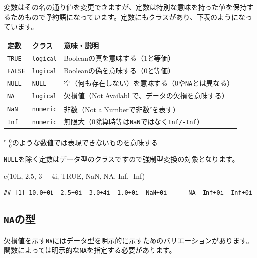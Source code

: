 \documentclass[
  12pt,
]{book}
\newenvironment{Shaded}{\begin{snugshade}}{\end{snugshade}}
\newcommand{\ConstantTok}[1]{\textcolor[rgb]{0.00,0.00,0.00}{#1}}
\newcommand{\DecValTok}[1]{\textcolor[rgb]{0.00,0.00,0.81}{#1}}
\newcommand{\FloatTok}[1]{\textcolor[rgb]{0.00,0.00,0.81}{#1}}
\newcommand{\FunctionTok}[1]{\textcolor[rgb]{0.00,0.00,0.00}{#1}}
\newcommand{\NormalTok}[1]{#1}
\newcommand{\SpecialCharTok}[1]{\textcolor[rgb]{0.00,0.00,0.00}{#1}}
\begin{document}
変数はその名の通り値を変更できますが、定数は特別な意味を持った値を保持するためもので予約語になっています。定数にもクラスがあり、下表のようになっています。

\begin{longtable}[]{@{}lll@{}}
\toprule
定数 & クラス & 意味・説明 \\
\midrule
\endhead
\texttt{TRUE} & \texttt{logical} & Booleanの真を意味する（\(1\)と等価） \\
\texttt{FALSE} & \texttt{logical} & Booleanの偽を意味する（\(0\)と等価） \\
\texttt{NULL} & \texttt{NULL} & 空（何も存在しない）を意味する（\(0\)や\texttt{NA}とは異なる） \\
\texttt{NA} & \texttt{logical} & 欠損値（Not Availabl で、データの欠損を意味する） \\
\texttt{NaN} & \texttt{numeric} & 非数（Not a Numberで非数\textsuperscript{c}を表す） \\
\texttt{Inf} & \texttt{numeric} & 無限大（\(0\)除算時等は\texttt{NaN}ではなく\texttt{Inf/-Inf}） \\
\bottomrule
\end{longtable}

\textsuperscript{c} \(\frac{0}{0}\)のような数値では表現できないものを意味する

\texttt{NULL}を除く定数はデータ型のクラスですので強制型変換の対象となります。

\begin{Shaded}
\begin{Highlighting}[]
\FunctionTok{c}\NormalTok{(10L, }\FloatTok{2.5}\NormalTok{, }\DecValTok{3} \SpecialCharTok{+}\NormalTok{ 4i, }\ConstantTok{TRUE}\NormalTok{, }\ConstantTok{NaN}\NormalTok{, }\ConstantTok{NA}\NormalTok{, }\ConstantTok{Inf}\NormalTok{, }\SpecialCharTok{{-}}\ConstantTok{Inf}\NormalTok{)}
\end{Highlighting}
\end{Shaded}

\begin{verbatim}
## [1] 10.0+0i  2.5+0i  3.0+4i  1.0+0i  NaN+0i      NA  Inf+0i -Inf+0i
\end{verbatim}

\hypertarget{naux306eux578b}{%
\subsection{\texorpdfstring{\texttt{NA}の型}{NAの型}}\label{naux306eux578b}}

欠損値を示す\texttt{NA}にはデータ型を明示的に示すためのバリエーションがあります。関数によっては明示的な\texttt{NA}を指定する必要があります。
\end{document}
